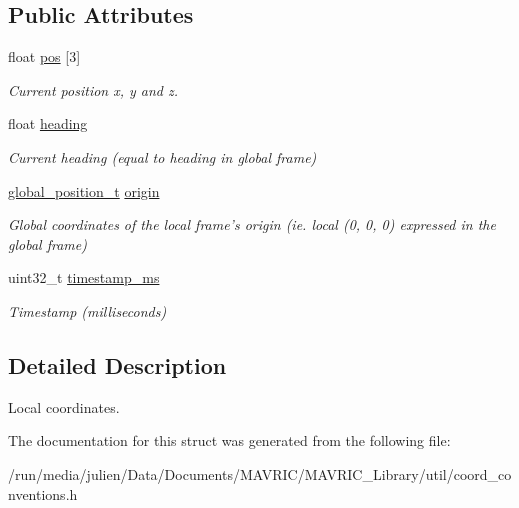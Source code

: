 \subsection*{Public Attributes}
\begin{DoxyCompactItemize}
\item 
\hypertarget{structlocal__coordinates__t_a80e27b4e850bc9d042326a7110e31155}{float \hyperlink{structlocal__coordinates__t_a80e27b4e850bc9d042326a7110e31155}{pos} \mbox{[}3\mbox{]}}\label{structlocal__coordinates__t_a80e27b4e850bc9d042326a7110e31155}

\begin{DoxyCompactList}\small\item\em Current position x, y and z. \end{DoxyCompactList}\item 
\hypertarget{structlocal__coordinates__t_a1be1250033d73b21d29c90e118f2c084}{float \hyperlink{structlocal__coordinates__t_a1be1250033d73b21d29c90e118f2c084}{heading}}\label{structlocal__coordinates__t_a1be1250033d73b21d29c90e118f2c084}

\begin{DoxyCompactList}\small\item\em Current heading (equal to heading in global frame) \end{DoxyCompactList}\item 
\hypertarget{structlocal__coordinates__t_afaeed5cd4f014ff99e31b826fc1f25d1}{\hyperlink{structglobal__position__t}{global\+\_\+position\+\_\+t} \hyperlink{structlocal__coordinates__t_afaeed5cd4f014ff99e31b826fc1f25d1}{origin}}\label{structlocal__coordinates__t_afaeed5cd4f014ff99e31b826fc1f25d1}

\begin{DoxyCompactList}\small\item\em Global coordinates of the local frame's origin (ie. local (0, 0, 0) expressed in the global frame) \end{DoxyCompactList}\item 
\hypertarget{structlocal__coordinates__t_aaefccff744d9e4ae581a89a728ab6a67}{uint32\+\_\+t \hyperlink{structlocal__coordinates__t_aaefccff744d9e4ae581a89a728ab6a67}{timestamp\+\_\+ms}}\label{structlocal__coordinates__t_aaefccff744d9e4ae581a89a728ab6a67}

\begin{DoxyCompactList}\small\item\em Timestamp (milliseconds) \end{DoxyCompactList}\end{DoxyCompactItemize}


\subsection{Detailed Description}
Local coordinates. 

The documentation for this struct was generated from the following file\+:\begin{DoxyCompactItemize}
\item 
/run/media/julien/\+Data/\+Documents/\+M\+A\+V\+R\+I\+C/\+M\+A\+V\+R\+I\+C\+\_\+\+Library/util/coord\+\_\+conventions.\+h\end{DoxyCompactItemize}
